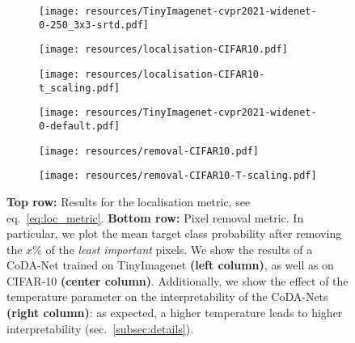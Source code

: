 \begin{figure*}
%
    \centering
    \begin{subfigure}[c]{0.32\textwidth}
    \centering
    \texttt{[image: resources/TinyImagenet-cvpr2021-widenet-0-250\_3x3-srtd.pdf]}
    \end{subfigure}
    \begin{subfigure}[c]{0.32\textwidth}
    \centering
    \texttt{[image: resources/localisation-CIFAR10.pdf]}
    \end{subfigure}
    \begin{subfigure}[c]{0.32\textwidth}
    \centering
    \texttt{[image: resources/localisation-CIFAR10-t\_scaling.pdf]}
    \end{subfigure}
    \begin{subfigure}[c]{0.320\textwidth}
    \centering
    \texttt{[image: resources/TinyImagenet-cvpr2021-widenet-0-default.pdf]}
    \end{subfigure}
    \begin{subfigure}[c]{0.320\textwidth}
    \centering
    \texttt{[image: resources/removal-CIFAR10.pdf]}
    \end{subfigure}
    \begin{subfigure}[c]{0.320\textwidth}
    \centering
    \texttt{[image: resources/removal-CIFAR10-T-scaling.pdf]}
    \end{subfigure}
    \caption{\small 
    \textbf{Top row:} Results for the localisation metric, see eq.~\eqref{eq:loc_metric}.
    \textbf{Bottom row:} Pixel removal metric. In particular, we plot the mean target class probability  after removing the $x\%$ of the \emph{least important} pixels.
    We show the results of a CoDA-Net trained on TinyImagenet \textbf{(left column)}, as well as on CIFAR-10 \textbf{(center column)}.
    Additionally, we show the effect of the temperature parameter on the interpretability of the CoDA-Nets \textbf{(right column)}:
    as expected, a higher temperature leads to higher interpretability (sec.~\ref{subsec:details}).
    }
    \label{fig:localisation}
\end{figure*}